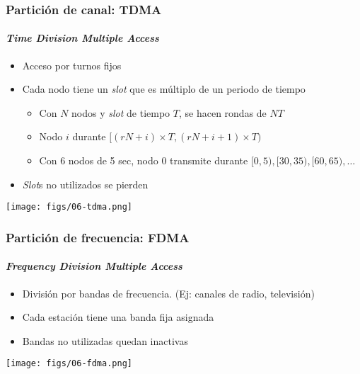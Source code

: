\documentclass[letter]{beamer}
\begin{document}
\begin{frame}
  \frametitle{Partición de canal: TDMA}
  \framesubtitle{{\em Time Division Multiple Access}}

  \begin{itemize}
    \item Acceso por turnos fijos
    \item Cada nodo tiene un {\em slot} que es múltiplo de un periodo de tiempo
      \begin{itemize}
        \item Con $N$ nodos y {\em slot} de tiempo $T$, se hacen rondas de $NT$
        \item Nodo $i$ durante $[(rN+i)\times T, (rN+i+1)\times T)$
        \item Con 6 nodos de 5 sec, nodo 0 transmite durante $[0,5), [30,35), [60,65), \ldots$
      \end{itemize}
    \item {\em Slot}s no utilizados se pierden
  \end{itemize}
  
  \begin{center}
    \texttt{[image: figs/06-tdma.png]}
  \end{center}


\end{frame}
\begin{frame}
  \frametitle{Partición de frecuencia: FDMA}
  \framesubtitle{{\em Frequency Division Multiple Access}}

  \begin{itemize}
    \item División por bandas de frecuencia. (Ej: canales de radio, televisión)
    \item Cada estación tiene una banda fija asignada
    \item Bandas no utilizadas quedan inactivas
  \end{itemize}

  \begin{center}
    \texttt{[image: figs/06-fdma.png]}
  \end{center}

\end{frame}
\end{document}
